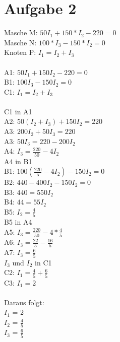 \documentclass{article}
\begin{document}
	\section*{Aufgabe 2}
	Masche M: $50I_1 + 150*I_2 -220 = 0$ \\
	Masche N: $100*I_3 - 150*I_2 = 0$ \\
	Knoten P: $I_1 = I_2 + I_3$ \\ \\
	A1: $50I_1 + 150I_2 -220 = 0$ \\
	B1: $100I_3 - 150I_2 = 0$ \\
	C1: $I_1 = I_2 + I_3$ \\ \\
	C1 in A1 \\
	A2: $50(I_2 + I_3) + 150I_2 = 220 $ \\
	A3: $200I_2 + 50I_3 = 220 $ \\
	A3: $50I_3 = 220 - 200I_2 $ \\
	A4: $I_3 = \frac{220}{50} - 4I_2 $ \\
	A4 in B1 \\
	B1: $100(\frac{220}{5} - 4I_2) - 150I_2 = 0$ \\
	B2: $440 - 400I_2 - 150I_2 = 0$ \\
	B3: $440 = 550I_2$ \\
	B4: $44 = 55I_2$ \\
	B5: $I_2 = \frac{4}{5}$ \\
	B5 in A4 \\
	A5: $I_3 = \frac{220}{50} - 4*\frac{4}{5} $ \\
	A6: $I_3 = \frac{22}{5} - \frac{16}{5} $ \\
	A7: $I_3 = \frac{6}{5} $ \\
	$I_3 $ und $I_2$ in C1 \\
	C2: $I_1 = \frac{4}{5}  + \frac{6}{5}$ \\
	C3: $I_1 = 2$ \\ \\
	Daraus folgt: \\
	$I_1$ = 2 \\
	$I_2$ = $\frac{4}{5}$ \\
	$I_3$ = $\frac{6}{5}$
	
\end{document}
